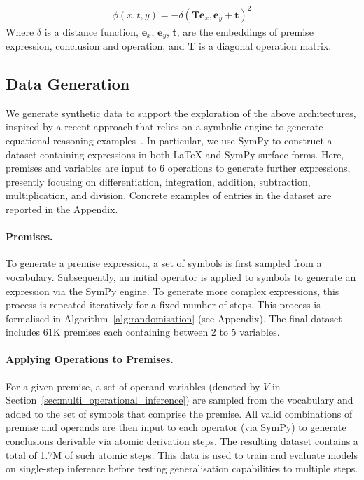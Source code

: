 \documentclass[11pt]{article}
\begin{document}
\begin{equation}
    \label{eq:translation}
    \begin{aligned}
        \phi(x,t,y) = -\delta(\textbf{T}\textbf{e}_x, \textbf{e}_y + \textbf{t})^2
    \end{aligned}
\end{equation}
Where $\delta$ is a distance function, $\textbf{e}_x$, $\textbf{e}_y$, \textbf{t}, are the embeddings of premise expression, conclusion and operation, and \textbf{T} is a diagonal operation matrix.

\subsection{Data Generation}
\label{sec:synthetic_data}
We generate synthetic data to support the exploration of the above architectures, inspired by a recent approach that relies on a symbolic engine to generate equational reasoning examples~\cite{meadows2023symbolic}. In particular, we use SymPy \cite{meurer2017sympy} to construct a dataset containing expressions in both LaTeX and SymPy surface forms. Here, premises and variables are input to 6 operations to generate further expressions, presently focusing on differentiation, integration, addition, subtraction, multiplication, and division. Concrete examples of entries in the dataset are reported in the Appendix.

\paragraph{Premises.} To generate a premise expression, a set of symbols is first sampled from a vocabulary. Subsequently, an initial operator is applied to symbols to generate an expression via the SymPy engine. To generate more complex expressions, this process is repeated iteratively for a fixed number of steps. 
This process is formalised in Algorithm~\ref{alg:randomisation} (see Appendix). The final dataset includes 61K premises each containing between 2 to 5 variables. 

\paragraph{Applying Operations to Premises.} For a given premise, a set of operand variables (denoted by $V$ in Section~\ref{sec:multi_operational_inference}) are sampled from the vocabulary and added to the set of symbols that comprise the premise. All valid combinations of premise and operands are then input to each operator (via SymPy) to generate conclusions derivable via atomic derivation steps. The resulting dataset contains a total of 1.7M of such atomic steps. This data is used to train and evaluate models on single-step inference before testing generalisation capabilities to multiple steps.
\end{document}
